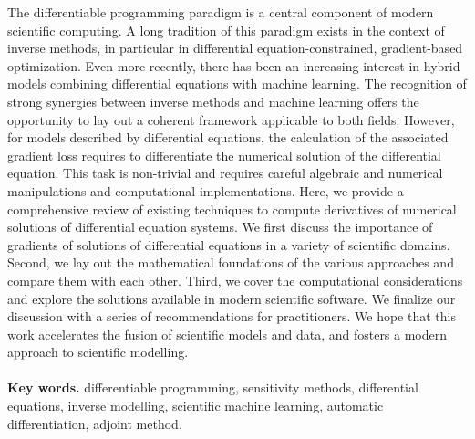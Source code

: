 {\footnotesize
The differentiable programming paradigm is a central component of modern scientific computing. 
A long tradition of this paradigm exists in the context of inverse methods, in particular in differential equation-constrained, gradient-based optimization.
Even more recently, there has been an increasing interest in hybrid models combining differential equations with machine learning. 
The recognition of strong synergies between inverse methods and machine learning offers the opportunity to lay out a coherent framework applicable to both fields.
However, for models described by differential equations, the calculation of the associated gradient loss requires to differentiate the numerical solution of the differential equation. 
This task is non-trivial and requires careful algebraic and numerical manipulations and computational implementations.
Here, we provide a comprehensive review of existing techniques to compute derivatives of numerical solutions of differential equation systems.
We first discuss the importance of gradients of solutions of differential equations in a variety of scientific domains.
Second, we lay out the mathematical foundations of the various approaches and compare them with each other. 
Third, we cover the computational considerations and explore the solutions available in modern scientific software.
We finalize our discussion with a series of recommendations for practitioners. 
We hope that this work accelerates the fusion of scientific models and data, and fosters a modern approach to scientific modelling.
\\ \\
\noindent \textbf{Key words.} differentiable programming, sensitivity methods, differential equations, inverse modelling, scientific machine learning, automatic differentiation, adjoint method.
}

